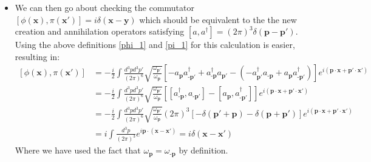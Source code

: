 \documentclass[11pt]{article}
\numberwithin{equation}{section}
\begin{document}
\begin{itemize}
\item We can then go about checking the commutator $[\phi(\textbf{x}),\pi(\textbf{x}')]= i \delta(\textbf{x}-\textbf{y})$ which should be equivalent to the the new creation and annihilation operators satisfying $[a,a^{\dagger}] = (2 \pi)^{3}\delta(\textbf{p}-\textbf{p}')$. Using the above definitions \ref{phi_1} and \ref{pi_1} for this calculation is easier, resulting in:
\begin{equation}
\begin{split}
  [\phi(\textbf{x}),\pi(\textbf{x}')] & = -\frac{i}{2}\int \frac{d^3pd^3p'}{(2\pi)^6}\sqrt{\frac{\omega_{\textbf{p}'}}{\omega_{\textbf{p}}}}\left[-a_{\textbf{p}}a^{\dagger}_{\textbf{-p}'} + a^{\dagger}_{\textbf{-p}}a_{\textbf{p}'}-(-a^{\dagger}_{\textbf{p}'}a_{\textbf{-p}} + a_{\textbf{p}}a^{\dagger}_{\textbf{-p}'})\right]e^{i(\textbf{p}\cdot \textbf{x}+\textbf{p}'\cdot \textbf{x}')} \\ 
  &  = -\frac{i}{2}\int \frac{d^3pd^3p'}{(2\pi)^6}\sqrt{\frac{\omega_{\textbf{p}'}}{\omega_{\textbf{p}}}}\left[[a^{\dagger}_{\textbf{-p}},a_{\textbf{-p}'}]-[a_{\textbf{p}},a^{\dagger}_{\textbf{-p}'}]\right]e^{i(\textbf{p}\cdot \textbf{x}+\textbf{p}'\cdot \textbf{x}')}  \\ 
   & =  -\frac{i}{2}\int \frac{d^3pd^3p'}{(2\pi)^6}\sqrt{\frac{\omega_{\textbf{p}'}}{\omega_{\textbf{p}}}}(2\pi)^3\left[-\delta(\textbf{p}'+\textbf{p}) -\delta(\textbf{p}+\textbf{p}') \right]e^{i(\textbf{p}\cdot \textbf{x}+\textbf{p}'\cdot \textbf{x}')}  \\ 
   & = i\int \frac{d^3p}{(2\pi)^3}e^{i\textbf{p}\cdot( \textbf{x} -\textbf{x}')} = i\delta(\textbf{x} -\textbf{x}')  
  \end{split}
  \end{equation}  
  Where we have used the fact that $\omega_{\textbf{p}}=\omega_{\textbf{-p}}$ by definition. 
\end{itemize}
\end{document}
